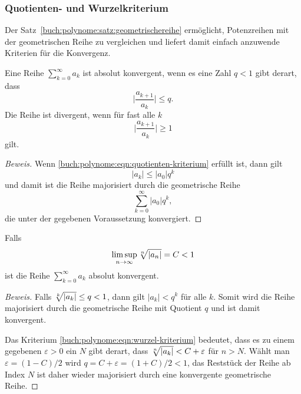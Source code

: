 \subsubsection{Quotienten- und Wurzelkriterium}
Der Satz~\ref{buch:polynome:satz:geometrischereihe} ermöglicht,
Potenzreihen mit der geometrischen Reihe zu vergleichen und
liefert damit einfach anzuwende Kriterien für die Konvergenz.

\begin{satz}[Quotientenkriterium]
%
\label{buch:polynome:satz:quotientenkriterium}
%
Eine Reihe 
\(
\sum_{k=0}^\infty  a_k
\)
ist absolut konvergent, wenn es eine Zahl $q<1$ gibt derart, dass
\begin{equation}
\biggl|\frac{a_{k+1}}{a_k}\biggr|\le q.
\label{buch:polynome:eqn:quotienten-kriterium}
\end{equation}
Die Reihe ist divergent, wenn für fast alle $k$
\[
\biggl|\frac{a_{k+1}}{a_k}\biggr| \ge 1
\]
gilt.
\end{satz}

\begin{proof}[Beweis]
Wenn \eqref{buch:polynome:eqn:quotienten-kriterium} erfüllt ist, dann
gilt
\[
|a_k| \le |a_0| q^k
\]
und damit ist die Reihe majorisiert durch die geometrische Reihe 
\[
\sum_{k=0}^\infty
|a_0|q^k,
\]
die unter der gegebenen Voraussetzung konvergiert.
\end{proof}

\begin{satz}[Wurzelkriterium]
%
\label{buch:polynome:satz:wurzelkriterium}
Falls
\begin{equation}
\limsup_{n\to\infty} \root{n}\of{|a_n|} = C < 1
\label{buch:polynome:eqn:wurzel-kriterium}
\end{equation}
ist die Reihe
\(
\sum_{k=0}^\infty a_k
\)
absolut konvergent.
\end{satz}

\begin{proof}[Beweis]
Falls $\root{k}\of{|a_k|}\le q<1$, dann gilt
$|a_k|<q^k$ für alle $k$.
Somit wird die Reihe majorisiert durch die geometrische Reihe
mit Quotient $q$ und ist damit konvergent.

Das Kriterium \eqref{buch:polynome:eqn:wurzel-kriterium} bedeutet,
dass es zu einem gegebenen $\varepsilon > 0$ ein $N$ gibt derart,
dass $\root{n}\of{|a_k|} < C+\varepsilon$ für $n>N$.  
Wählt man $\varepsilon = (1-C)/2$ wird $q=C+\varepsilon=(1+C)/2<1$,
das Reststück der Reihe ab Index $N$ ist daher wieder majorisiert
durch eine konvergente geometrische Reihe.
\end{proof}

